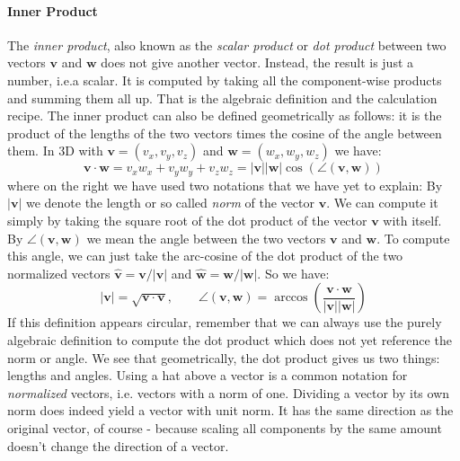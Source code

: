 \paragraph{Inner Product}
The \emph{inner product}, also known as the \emph{scalar product} or \emph{dot product} between two vectors $\mathbf{v}$ and $\mathbf{w}$ does not give another vector. Instead, the result is just a number, i.e.a scalar. It is computed by taking all the component-wise products and summing them all up. That is the algebraic definition and the calculation recipe. The inner product can also be defined geometrically as follows: it is the product of the lengths of the two vectors times the cosine of the angle between them. In 3D with $\mathbf{v} = (v_x, v_y, v_z)$ and $\mathbf{w} = (w_x, w_y, w_z)$ we have:
\begin{equation}
 \mathbf{v} \cdot \mathbf{w} 
 = v_x w_x + v_y w_y + v_z w_z 
 = |\mathbf{v}| |\mathbf{w}| \cos( \angle(\mathbf{v}, \mathbf{w}) )
\end{equation}
where on the right we have used two notations that we have yet to explain: By $|\mathbf{v}|$ we denote the length or so called \emph{norm} of the vector $\mathbf{v}$. We can compute it simply by taking the square root of the dot product of the vector $\mathbf{v}$ with itself. By $\angle(\mathbf{v}, \mathbf{w})$ we mean the angle between the two vectors $\mathbf{v}$ and $\mathbf{w}$. To compute this angle, we can just take the arc-cosine of the dot product of the two normalized vectors $\mathbf{\hat{v}} = \mathbf{v} / |\mathbf{v}|$ and  $\mathbf{\hat{w}} = \mathbf{w} / |\mathbf{w}|$. So we have:
\begin{equation}
|\mathbf{v}| = \sqrt{ \mathbf{v} \cdot \mathbf{v}}, 
\qquad 
\angle(\mathbf{v}, \mathbf{w}) = 
 \arccos \left( \frac{\mathbf{v} \cdot \mathbf{w}} {|\mathbf{v}|  |\mathbf{w}|} \right)
\end{equation}
If this definition appears circular, remember that we can always use the purely algebraic definition to compute the dot product which does not yet reference the norm or angle. We see that geometrically, the dot product gives us two things: lengths and angles. Using a hat above a vector is a common notation for \emph{normalized} vectors, i.e. vectors with a norm of one. Dividing a vector by its own norm does indeed yield a vector with unit norm. It has the same direction as the original vector, of course - because scaling all components by the same amount doesn't change the direction of a vector.



